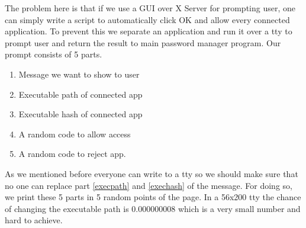 \documentclass[journal]{IEEEtran}
\begin{document}
The problem here is that if we use a GUI over X Server for prompting user, one can simply write a script to automatically click OK and allow every connected application. To prevent this we separate an application and run it over a tty to prompt user and return the result to main password manager program. Our prompt consists of 5 parts. 


\begin{enumerate}

\item Message we want to show to user
\item Executable path of connected app \label{execpath}
\item Executable hash of connected app \label{exechash}
\item A random code to allow access
\item A random code to reject app.

\end{enumerate}

As we mentioned before everyone can write to a tty so we should make sure that no one can replace part \ref{execpath} and \ref{exechash} of the message. For doing so, we print these 5 parts in 5 random points of the page. In a 56x200 tty the chance of changing the executable path is 0.000000008 which is a very small number and hard to achieve.




\ifCLASSOPTIONcaptionsoff
 \newpage
\fi










\end{document}
